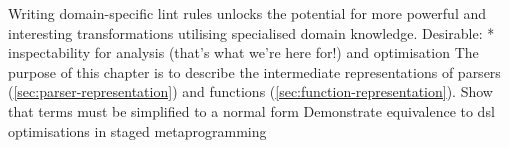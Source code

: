 \documentclass[../../main.tex]{subfiles}
\begin{document}
Writing domain-specific lint rules unlocks the potential for more powerful and interesting transformations utilising specialised domain knowledge.
Desirable:
* inspectability for analysis (that's what we're here for!) and optimisation
The purpose of this chapter is to describe the intermediate representations of parsers (\cref{sec:parser-representation}) and functions (\cref{sec:function-representation}).
Show that terms must be simplified to a normal form
Demonstrate equivalence to dsl optimisations in staged metaprogramming



\end{document}

